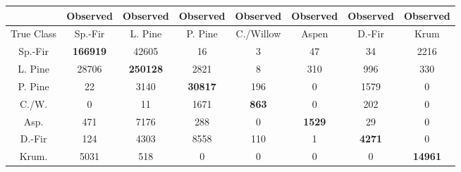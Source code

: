 \documentclass[11pt]{article}
\begin{document}
\begin{center}
\begin{tabular}{|c | c| c| c| c| c |c| c|}
\hline
 & Observed& Observed& Observed& Observed& Observed& Observed& Observed \\ \hline
True Class & Sp.-Fir & L. Pine & P. Pine & C./Willow & Aspen & D.-Fir & Krum \\ \hline
Sp.-Fir & \textbf{166919} & 42605 & 16 & 3 & 47 & 34 & 2216 \\ \hline
L. Pine & 28706 & \textbf{250128} & 2821 & 8 & 310 & 996 & 330 \\ \hline
P. Pine & 22 & 3140 &  \textbf{30817} & 196 & 0 & 1579 & 0 \\ \hline
C./W. & 0 & 11 & 1671 &  \textbf{863} & 0 & 202 & 0 \\ \hline
Asp. & 471 & 7176 & 288 & 0 &  \textbf{1529} & 29 & 0 \\ \hline
D.-Fir & 124 & 4303 & 8558 & 110 & 1 &  \textbf{4271} & 0 \\ \hline
Krum. & 5031 & 518 & 0 & 0 & 0 & 0 &  \textbf{14961} \\ \hline
\end{tabular}
\end{center}
\end{document}
